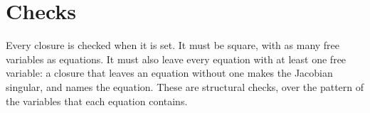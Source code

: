 \section{Checks}

Every closure is checked when it is set. It must be square, with as many free
variables as equations. It must also leave every equation with at least one
free variable: a closure that leaves an equation without one makes the
Jacobian singular, and  names the equation. These are
structural checks, over the pattern of the variables that each equation
contains.
